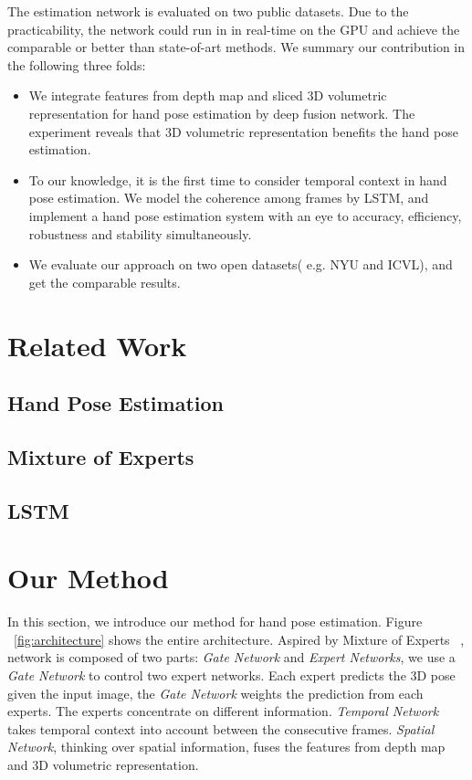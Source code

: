 \documentclass[journal,comsoc]{IEEEtran}
\begin{document}
The estimation network is evaluated on two public datasets. Due to the practicability, the network 
could run in in real-time on the GPU and achieve the comparable or better than state-of-art methods.
We summary our contribution in the following three folds:
\begin{itemize}
  \item
  We integrate features from depth map and sliced 3D volumetric representation for hand pose
  estimation by deep fusion network. The experiment reveals that 3D volumetric representation 
  benefits the hand pose estimation.
  \item
  To our knowledge, it is the first time to consider temporal context in hand pose
  estimation. We model the coherence among frames by LSTM, and implement a hand pose
  estimation system with an eye to accuracy, efficiency, robustness and stability
  simultaneously.
  \item
  We evaluate our approach on two open datasets( e.g. NYU and ICVL), and get the
  comparable results.
\end{itemize}


\section{Related Work}\label{sec:related work}
\subsection{Hand Pose Estimation}
\subsection{Mixture of Experts}
\subsection{LSTM}


\section{Our Method}\label{sec:our method}
In this section, we introduce our method for hand pose estimation. Figure
~\ref{fig:architecture} shows the entire architecture. Aspired by Mixture of Experts
~\cite{jacobs1991adaptive}, network is composed of two parts: \emph{Gate Network} and
\emph{Expert Networks}, we use a \emph{Gate Network} to control two expert networks.
Each expert predicts the 3D pose given the input image, the \emph{Gate Network} weights
the prediction from each experts. The experts concentrate on different information.
\emph{Temporal Network} takes temporal context into account between the consecutive frames.
\emph{Spatial Network}, thinking over spatial information, fuses the features from depth
map and 3D volumetric representation.
\end{document}
